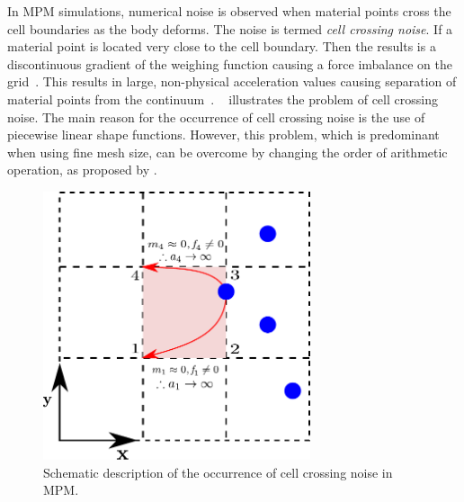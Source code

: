 In MPM simulations, numerical noise is observed when material points 
cross the cell boundaries as the body deforms. The noise is termed \textit{cell 
crossing noise}. If a material point is located very close to 
the cell boundary. Then the results is a discontinuous gradient of the weighing 
function causing a force imbalance on the grid~\citep{Bardenhagen2004}. This 
results in large, non-physical acceleration values causing separation of 
material points from the continuum~\citep{Sulsky1995}. 
~ illustrates the problem of cell crossing noise. The 
main reason for the occurrence of cell crossing noise is the use of piecewise 
linear shape functions. However, this problem, which is predominant when using 
fine mesh size, can be overcome by changing the order of arithmetic operation, 
as proposed by \citet{Sulsky1995}. 

\begin{figure}[htbp]
\centering
\includegraphics[width=0.7\textwidth]{cellnoise}
\caption{Schematic description of the occurrence of cell crossing noise in MPM.}
\label{fig:cellnoise}
\end{figure}

